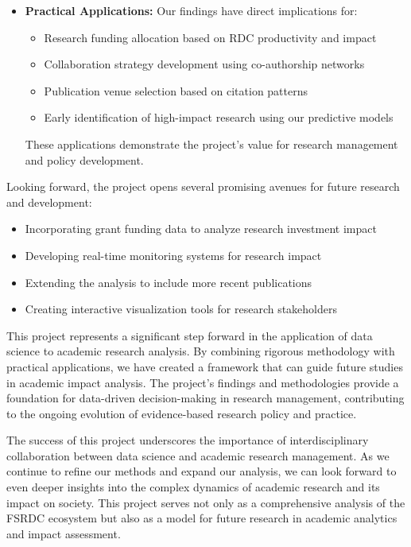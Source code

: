 \documentclass[12pt]{article}
\begin{document}
\begin{itemize}
    \item \textbf{Practical Applications:} Our findings have direct implications for:
    \begin{itemize}
        \item Research funding allocation based on RDC productivity and impact
        \item Collaboration strategy development using co-authorship networks
        \item Publication venue selection based on citation patterns
        \item Early identification of high-impact research using our predictive models
    \end{itemize}
    These applications demonstrate the project's value for research management and policy development.
\end{itemize}

Looking forward, the project opens several promising avenues for future research and development:

\begin{itemize}
    \item Incorporating grant funding data to analyze research investment impact
    \item Developing real-time monitoring systems for research impact
    \item Extending the analysis to include more recent publications
    \item Creating interactive visualization tools for research stakeholders
\end{itemize}

This project represents a significant step forward in the application of data science to academic research analysis. By combining rigorous methodology with practical applications, we have created a framework that can guide future studies in academic impact analysis. The project's findings and methodologies provide a foundation for data-driven decision-making in research management, contributing to the ongoing evolution of evidence-based research policy and practice.

The success of this project underscores the importance of interdisciplinary collaboration between data science and academic research management. As we continue to refine our methods and expand our analysis, we can look forward to even deeper insights into the complex dynamics of academic research and its impact on society. This project serves not only as a comprehensive analysis of the FSRDC ecosystem but also as a model for future research in academic analytics and impact assessment.
\end{document}
